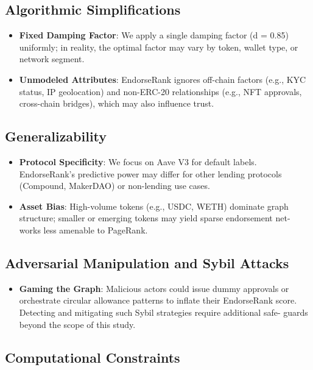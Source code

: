 \documentclass[
]{article}
\begin{document}
\subsection{Algorithmic Simplifications}\label{algorithmic-simplifications}

\begin{itemize}
\item
  \textbf{Fixed Damping Factor}: We apply a single damping factor (d = 0.85) uniformly; in reality, the optimal factor may vary by token, wallet type, or network segment.
\item
  \textbf{Unmodeled Attributes}: EndorseRank ignores off-chain factors (e.g., KYC status, IP geolocation) and non-ERC-20 relationships (e.g., NFT approvals, cross-chain bridges), which may also influence trust.
\end{itemize}

\subsection{Generalizability}\label{generalizability}

\begin{itemize}
\item
  \textbf{Protocol Specificity}: We focus on Aave V3 for default labels. EndorseRank's predictive power may differ for other lending protocols (Compound, MakerDAO) or non-lending use cases.
\item
  \textbf{Asset Bias}: High-volume tokens (e.g., USDC, WETH) dominate graph structure; smaller or emerging tokens may yield sparse endorsement net- works less amenable to PageRank.
\end{itemize}

\subsection{Adversarial Manipulation and Sybil Attacks}\label{adversarial-manipulation-and-sybil-attacks}

\begin{itemize}
\item
  \textbf{Gaming the Graph}: Malicious actors could issue dummy approvals or orchestrate circular allowance patterns to inflate their EndorseRank score. Detecting and mitigating such Sybil strategies require additional safe- guards beyond the scope of this study.
\end{itemize}

\subsection{Computational Constraints}\label{computational-constraints}
\end{document}
